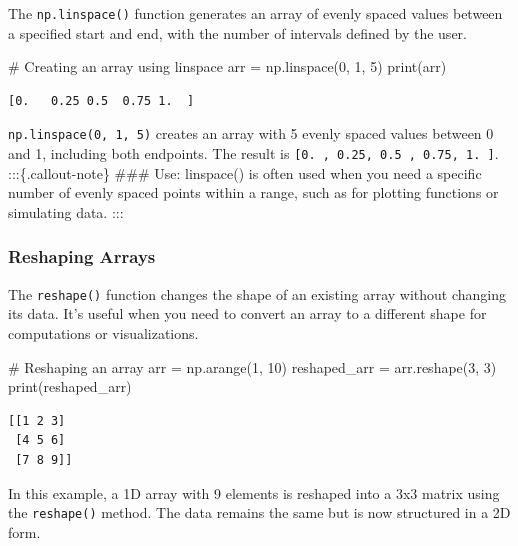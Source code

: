\documentclass[
  letterpaper,
  DIV=11,
  numbers=noendperiod]{scrreprt}
\newenvironment{Shaded}{\begin{snugshade}}{\end{snugshade}}
\newcommand{\BuiltInTok}[1]{\textcolor[rgb]{0.00,0.23,0.31}{#1}}
\newcommand{\CommentTok}[1]{\textcolor[rgb]{0.37,0.37,0.37}{#1}}
\newcommand{\DecValTok}[1]{\textcolor[rgb]{0.68,0.00,0.00}{#1}}
\newcommand{\NormalTok}[1]{\textcolor[rgb]{0.00,0.23,0.31}{#1}}
\newcommand{\OperatorTok}[1]{\textcolor[rgb]{0.37,0.37,0.37}{#1}}
\theoremstyle{plain}
\theoremstyle{definition}
\theoremstyle{remark}
\begin{document}
The \texttt{np.linspace()} function generates an array of evenly spaced
values between a specified start and end, with the number of intervals
defined by the user.

\begin{Shaded}
\begin{Highlighting}[]
\CommentTok{\# Creating an array using linspace}
\NormalTok{arr }\OperatorTok{=}\NormalTok{ np.linspace(}\DecValTok{0}\NormalTok{, }\DecValTok{1}\NormalTok{, }\DecValTok{5}\NormalTok{)}
\BuiltInTok{print}\NormalTok{(arr)}
\end{Highlighting}
\end{Shaded}

\begin{verbatim}
[0.   0.25 0.5  0.75 1.  ]
\end{verbatim}

\texttt{np.linspace(0,\ 1,\ 5)} creates an array with 5 evenly spaced
values between 0 and 1, including both endpoints. The result is
\texttt{{[}0.\ ,\ 0.25,\ 0.5\ ,\ 0.75,\ 1.\ {]}}. :::\{.callout-note\}
\#\#\# Use: linspace() is often used when you need a specific number of
evenly spaced points within a range, such as for plotting functions or
simulating data. :::

\subsubsection{Reshaping Arrays}\label{reshaping-arrays}

The \texttt{reshape()} function changes the shape of an existing array
without changing its data. It's useful when you need to convert an array
to a different shape for computations or visualizations.

\begin{Shaded}
\begin{Highlighting}[]
\CommentTok{\# Reshaping an array}
\NormalTok{arr }\OperatorTok{=}\NormalTok{ np.arange(}\DecValTok{1}\NormalTok{, }\DecValTok{10}\NormalTok{)}
\NormalTok{reshaped\_arr }\OperatorTok{=}\NormalTok{ arr.reshape(}\DecValTok{3}\NormalTok{, }\DecValTok{3}\NormalTok{)}
\BuiltInTok{print}\NormalTok{(reshaped\_arr)}
\end{Highlighting}
\end{Shaded}

\begin{verbatim}
[[1 2 3]
 [4 5 6]
 [7 8 9]]
\end{verbatim}

In this example, a 1D array with 9 elements is reshaped into a 3x3
matrix using the \texttt{reshape()} method. The data remains the same
but is now structured in a 2D form.
\end{document}
